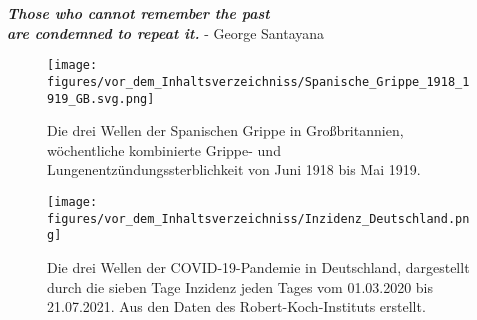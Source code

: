 \vspace*{20pt}
\begin{center}
    \huge{\textbf{
    \textit{Those who cannot remember the past\\ are condemned to repeat it.}}}
    \large{- George Santayana \autocite{history-quoteSantayana}}
\end{center}
\vspace*{50pt}
\begin{figure}[h]
    \centering
    \texttt{[image: figures/vor\_dem\_Inhaltsverzeichniss/Spanische\_Grippe\_1918\_1919\_GB.svg.png]}
    \caption{Die drei Wellen der \glqq{}Spanischen Grippe\grqq{} in Großbritannien, wöchentliche kombinierte Grippe- und Lungenentzündungssterblichkeit von Juni 1918 bis Mai 1919. \autocite{spanischflu}}
    \label{fig:spanishflu}
\end{figure}
\vspace*{10pt}
\begin{figure}[h]
    \centering
    \texttt{[image: figures/vor\_dem\_Inhaltsverzeichniss/Inzidenz\_Deutschland.png]}
    \caption{Die drei Wellen der COVID-19-Pandemie in Deutschland, dargestellt durch die sieben Tage Inzidenz jeden Tages vom 01.03.2020 bis 21.07.2021. Aus den Daten des Robert-Koch-Instituts erstellt.}
    \label{fig:germany_incidence}
\end{figure}